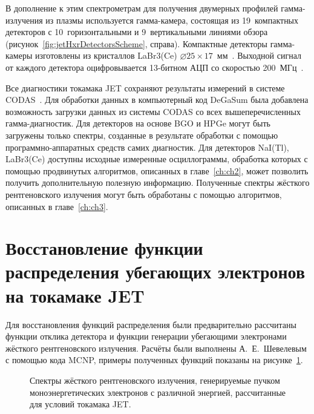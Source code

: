 В дополнение к этим спектрометрам для получения двумерных профилей гамма-излучения из плазмы используется гамма-камера, состоящая из 19~компактных детекторов с 10~горизонтальными и 9~вертикальными линиями обзора (рисунок~\ref{fig:jetHxrDetectorsScheme}, справа). Компактные детекторы гамма-камеры изготовлены из кристаллов LaBr3(Ce) $\varnothing 25 \times 17$~мм~\cite{Rigamonti2018}. Выходной сигнал от каждого детектора оцифровывается 13-битном АЦП со скоростью 200~МГц~\cite{Fernandes2018}.

Все диагностики токамака JET сохраняют результаты измерений в системе CODAS~\cite{Jones1986}. Для обработки данных в компьютерный код DeGaSum была добавлена возможность загрузки данных из системы CODAS со всех вышеперечисленных гамма-диагностик. Для детекторов на основе BGO и HPGe могут быть загружены только спектры, созданные в результате обработки с помощью программно-аппаратных средств самих диагностик. Для детекторов NaI(Tl), LaBr3(Ce) доступны исходные измеренные осциллограммы, обработка которых с помощью продвинутых алгоритмов, описанных в главе~\ref{ch:ch2}, может позволить получить дополнительную полезную информацию. Полученные спектры жёсткого рентгеновского излучения могут быть обработаны с помощью алгоритмов, описанных в главе~\ref{ch:ch3}. 


\section{Восстановление функции распределения убегающих электронов на токамаке JET}

Для восстановления функций распределения были предварительно рассчитаны функции отклика детектора и функции генерации убегающими электронами жёсткого рентгеновского излучения. Расчёты были выполнены А.~Е.~Шевелевым с помощью кода MCNP, примеры полученных функций показаны на рисунке~\ref{fig:jetGenerationFunctions}. 

\begin{figure}[ht!]
  \caption{ Спектры жёсткого рентгеновского излучения, генерируемые пучком моноэнергетических электронов с различной энергией, рассчитанные для условий токамака JET.~\cite{Shevelev2013} }
  \label{fig:jetGenerationFunctions}
\end{figure}


